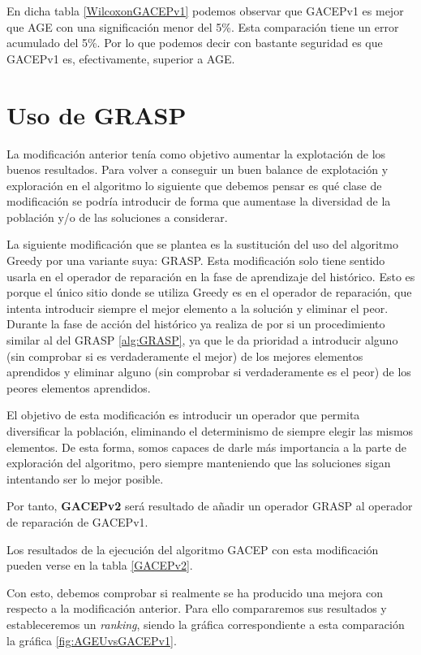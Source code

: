 En dicha tabla \ref{WilcoxonGACEPv1} podemos observar que GACEPv1 es mejor que AGE con una significación menor del 5\%. 
Esta comparación tiene un error acumulado del 5\%. 
Por lo que podemos decir con bastante seguridad es que GACEPv1 es, efectivamente, superior a AGE.

\section{Uso de GRASP}

La modificación anterior tenía como objetivo aumentar la explotación de los buenos resultados. 
Para volver a conseguir un buen balance de explotación y exploración en el algoritmo lo siguiente que debemos pensar es qué clase de modificación se podría introducir de forma que aumentase la diversidad de la población y/o de las soluciones a considerar. 

La siguiente modificación que se plantea es la sustitución del uso del algoritmo Greedy por una variante suya: GRASP. 
Esta modificación solo tiene sentido usarla en el operador de reparación en la fase de aprendizaje del histórico. 
Esto es porque el único sitio donde se utiliza Greedy es en el operador de reparación, que intenta introducir siempre el mejor elemento a la solución y eliminar el peor. 
Durante la fase de acción del histórico ya realiza de por si un procedimiento similar al del GRASP \ref{alg:GRASP}, ya que le da prioridad a introducir alguno (sin comprobar si es verdaderamente el mejor) de los mejores elementos aprendidos y eliminar alguno (sin comprobar si verdaderamente es el peor) de los peores elementos aprendidos. 

El objetivo de esta modificación es introducir un operador que permita diversificar la población, eliminando el determinismo de siempre elegir las mismos elementos. 
De esta forma, somos capaces de darle más importancia a la parte de exploración del algoritmo, pero siempre manteniendo que las soluciones sigan intentando ser lo mejor posible. 

Por tanto, \textbf{GACEPv2} será resultado de añadir un operador GRASP al operador de reparación de GACEPv1.

Los resultados de la ejecución del algoritmo GACEP con esta modificación pueden verse en la tabla \ref{GACEPv2}. 

Con esto, debemos comprobar si realmente se ha producido una mejora con respecto a la modificación anterior. 
Para ello compararemos sus resultados y estableceremos un \textit{ranking}, siendo la gráfica correspondiente a esta comparación la gráfica \ref{fig:AGEUvsGACEPv1}. 


